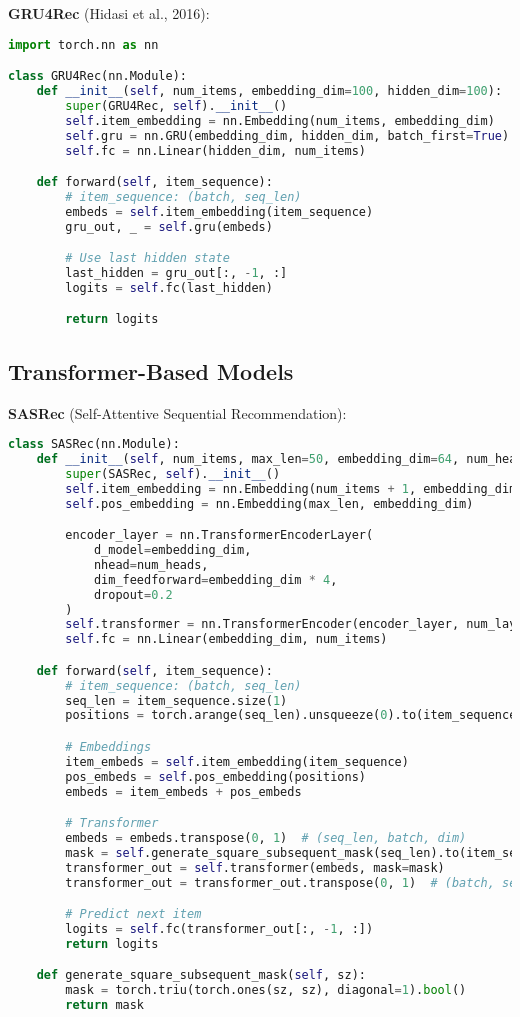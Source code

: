 \documentclass[10pt]{article}
\begin{document}
\textbf{GRU4Rec} (Hidasi et al., 2016):
\begin{lstlisting}[language=Python]
import torch.nn as nn

class GRU4Rec(nn.Module):
    def __init__(self, num_items, embedding_dim=100, hidden_dim=100):
        super(GRU4Rec, self).__init__()
        self.item_embedding = nn.Embedding(num_items, embedding_dim)
        self.gru = nn.GRU(embedding_dim, hidden_dim, batch_first=True)
        self.fc = nn.Linear(hidden_dim, num_items)

    def forward(self, item_sequence):
        # item_sequence: (batch, seq_len)
        embeds = self.item_embedding(item_sequence)
        gru_out, _ = self.gru(embeds)

        # Use last hidden state
        last_hidden = gru_out[:, -1, :]
        logits = self.fc(last_hidden)

        return logits
\end{lstlisting}

\subsection{Transformer-Based Models}

\textbf{SASRec} (Self-Attentive Sequential Recommendation):
\begin{lstlisting}[language=Python]
class SASRec(nn.Module):
    def __init__(self, num_items, max_len=50, embedding_dim=64, num_heads=2, num_layers=2):
        super(SASRec, self).__init__()
        self.item_embedding = nn.Embedding(num_items + 1, embedding_dim, padding_idx=0)
        self.pos_embedding = nn.Embedding(max_len, embedding_dim)

        encoder_layer = nn.TransformerEncoderLayer(
            d_model=embedding_dim,
            nhead=num_heads,
            dim_feedforward=embedding_dim * 4,
            dropout=0.2
        )
        self.transformer = nn.TransformerEncoder(encoder_layer, num_layers=num_layers)
        self.fc = nn.Linear(embedding_dim, num_items)

    def forward(self, item_sequence):
        # item_sequence: (batch, seq_len)
        seq_len = item_sequence.size(1)
        positions = torch.arange(seq_len).unsqueeze(0).to(item_sequence.device)

        # Embeddings
        item_embeds = self.item_embedding(item_sequence)
        pos_embeds = self.pos_embedding(positions)
        embeds = item_embeds + pos_embeds

        # Transformer
        embeds = embeds.transpose(0, 1)  # (seq_len, batch, dim)
        mask = self.generate_square_subsequent_mask(seq_len).to(item_sequence.device)
        transformer_out = self.transformer(embeds, mask=mask)
        transformer_out = transformer_out.transpose(0, 1)  # (batch, seq_len, dim)

        # Predict next item
        logits = self.fc(transformer_out[:, -1, :])
        return logits

    def generate_square_subsequent_mask(self, sz):
        mask = torch.triu(torch.ones(sz, sz), diagonal=1).bool()
        return mask
\end{lstlisting}
\end{document}
